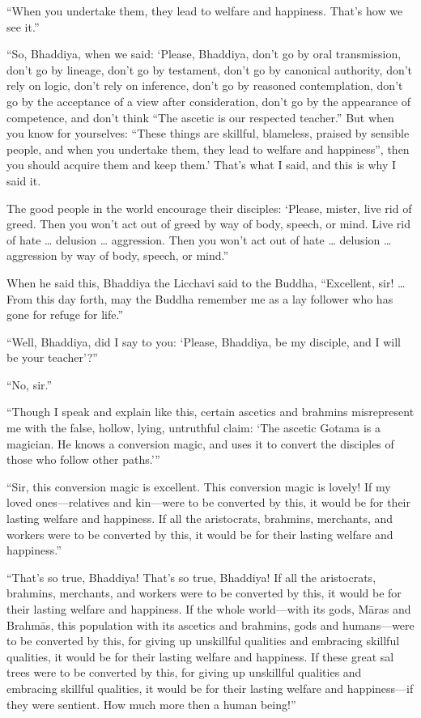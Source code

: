 \documentclass[12pt,openany]{book}%
\begin{document}
“When you undertake them, they lead to welfare and happiness. That’s how we see it.” 

“So, Bhaddiya, when we said: ‘Please, Bhaddiya, don’t go by oral transmission, don’t go by lineage, don’t go by testament, don’t go by canonical authority, don’t rely on logic, don’t rely on inference, don’t go by reasoned contemplation, don’t go by the acceptance of a view after consideration, don’t go by the appearance of competence, and don’t think “The ascetic is our respected teacher.” But when you know for yourselves: “These things are skillful, blameless, praised by sensible people, and when you undertake them, they lead to welfare and happiness”, then you should acquire them and keep them.’ That’s what I said, and this is why I said it. 

The good people in the world encourage their disciples: ‘Please, mister, live rid of greed. Then you won’t act out of greed by way of body, speech, or mind. Live rid of hate … delusion … aggression. Then you won’t act out of hate … delusion … aggression by way of body, speech, or mind.” 

When he said this, Bhaddiya the Licchavi said to the Buddha, “Excellent, sir! … From this day forth, may the Buddha remember me as a lay follower who has gone for refuge for life.” 

“Well, Bhaddiya, did I say to you: ‘Please, Bhaddiya, be my disciple, and I will be your teacher’?” 

“No, sir.” 

“Though I speak and explain like this, certain ascetics and brahmins misrepresent me with the false, hollow, lying, untruthful claim: ‘The ascetic Gotama is a magician. He knows a conversion magic, and uses it to convert the disciples of those who follow other paths.’” 

“Sir, this conversion magic is excellent. This conversion magic is lovely! If my loved ones—relatives and kin—were to be converted by this, it would be for their lasting welfare and happiness. If all the aristocrats, brahmins, merchants, and workers were to be converted by this, it would be for their lasting welfare and happiness.” 

“That’s so true, Bhaddiya! That’s so true, Bhaddiya! If all the aristocrats, brahmins, merchants, and workers were to be converted by this, it would be for their lasting welfare and happiness. If the whole world—with its gods, \textsanskrit{Māras} and \textsanskrit{Brahmās}, this population with its ascetics and brahmins, gods and humans—were to be converted by this, for giving up unskillful qualities and embracing skillful qualities, it would be for their lasting welfare and happiness. If these great sal trees were to be converted by this, for giving up unskillful qualities and embracing skillful qualities, it would be for their lasting welfare and happiness—if they were sentient. How much more then a human being!” 
\end{document}
